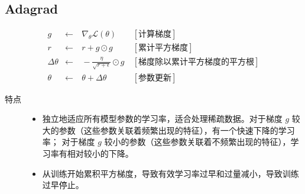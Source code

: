 \documentclass[letterpaper,10pt,english]{sphinxmanual}
\begin{document}
\subsection{Adagrad}
\label{\detokenize{deepLearning/08_optimizer:adagrad}}\begin{equation*}
\begin{split}g & \leftarrow &\ \nabla_{\theta} \mathcal{L}(\theta) &\  [\text{计算梯度}] \\
r & \leftarrow &\ r + g \odot g &\  [\text{累计平方梯度}] \\
\Delta \theta & \leftarrow &\ - \frac{\eta}{\sqrt{r+\epsilon}} \odot g &\  [\text{梯度除以累计平方梯度的平方根}] \\
\theta & \leftarrow &\  \theta + \Delta \theta &\ [\text{参数更新}]\end{split}
\end{equation*}\begin{description}
\item[{特点}] \leavevmode\begin{itemize}
\item {} 
独立地适应所有模型参数的学习率，适合处理稀疏数据。对于梯度 \(g\) 较大的参数（这些参数关联着频繁出现的特征），有一个快速下降的学习率；
对于梯度 \(g\) 较小的参数（这些参数关联着不频繁出现的特征），学习率有相对较小的下降。

\item {} 
从训练开始累积平方梯度，导致有效学习率过早和过量减小，导致训练过早停止。

\end{itemize}

\end{description}
\end{document}
